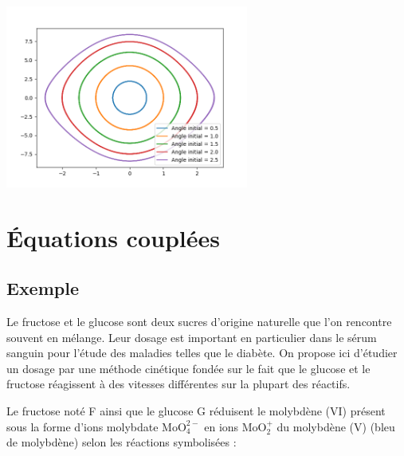 \begin{itemize}
\begin{lstlisting}
\end{lstlisting}
\begin{center}
\includegraphics[width=8cm]{Cours/Images/ED2_pendule3.png}
\end{center}
\end{itemize}
\section{Équations couplées}
\subsection{Exemple}
\def\F{\text{F}}
\def\G{\text{G}}
\def\MV{\text{Mo(V)}}
\def\MVI{\text{Mo(VI)}}
\def\IV{\text{MoO}_{4}^{2-}}
\def\IVI{\text{MoO}_2^+}
Le fructose et le glucose sont deux sucres d'origine naturelle que l'on rencontre souvent en mélange. Leur dosage est important en particulier dans le sérum sanguin pour l'étude des maladies telles que le diabète. On propose ici d'étudier un dosage par une méthode cinétique fondée sur le fait que le glucose et le fructose réagissent à des vitesses différentes sur la plupart des réactifs. 

Le fructose noté F ainsi que le glucose G réduisent le molybdène (VI) présent sous la forme d'ions molybdate $\IV$ en ions $\IVI$ du molybdène (V) (bleu de molybdène) selon les réactions symbolisées :


